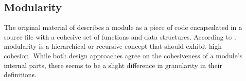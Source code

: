 \subsection{Modularity} \label{subsec_modularity}

The original material of \textcite[82]{robert_c_martin_clean_2018} describes a module as a
piece of code encapsulated in a source file with a cohesive set of functions and data
structures. According to \textcite[22]{mannaert_normalized_2016}, modularity is a
hierarchical or recursive concept that should exhibit high cohesion. While both design
approaches agree on the cohesiveness of a module's internal parts, there seems to be a
slight difference in granularity in their definitions.